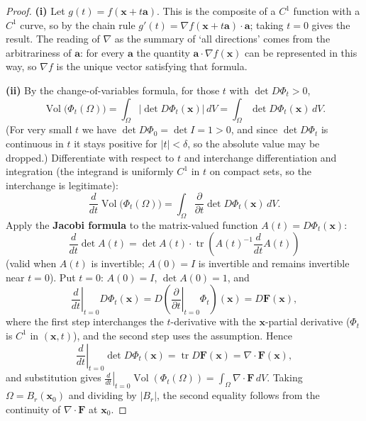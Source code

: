 \begin{proof}
\textbf{(i)} Let $g(t) = f(\mathbf x+t\mathbf a)$. This is the composite of a $C^1$ function with a $C^1$ curve, so by the chain rule $g'(t) = \nabla f(\mathbf x+t\mathbf a)\cdot\mathbf a$; taking $t=0$ gives the result. The reading of $\nabla$ as the summary of `all directions' comes from the arbitrariness of $\mathbf a$: for every $\mathbf a$ the quantity $\mathbf a\cdot\nabla f(\mathbf x)$ can be represented in this way, so $\nabla f$ is the unique vector satisfying that formula.

\textbf{(ii)} By the change-of-variables formula, for those $t$ with $\det D\Phi_t>0$,
\[
\operatorname{Vol}\bigl(\Phi_t(\Omega)\bigr) = \int_{\Omega}\bigl|\det D\Phi_t(\mathbf x)\bigr|\,dV = \int_{\Omega}\det D\Phi_t(\mathbf x)\,dV .
\]
(For very small $t$ we have $\det D\Phi_0 = \det I = 1>0$, and since $\det D\Phi_t$ is continuous in $t$ it stays positive for $|t|<\delta$, so the absolute value may be dropped.) Differentiate with respect to $t$ and interchange differentiation and integration (the integrand is uniformly $C^1$ in $t$ on compact sets, so the interchange is legitimate):
\[
\frac{d}{dt}\operatorname{Vol}\bigl(\Phi_t(\Omega)\bigr) = \int_{\Omega}\frac{\partial}{\partial t}\det D\Phi_t(\mathbf x)\,dV .
\]
Apply the \textbf{Jacobi formula} to the matrix-valued function $A(t) = D\Phi_t(\mathbf x)$:
\[
\frac{d}{dt}\det A(t) = \det A(t)\cdot\operatorname{tr}\!\left(A(t)^{-1}\frac{d}{dt}A(t)\right)
\]
(valid when $A(t)$ is invertible; $A(0)=I$ is invertible and remains invertible near $t=0$). Put $t=0$: $A(0)=I$, $\det A(0)=1$, and
\[
\left.\frac{d}{dt}\right|_{t=0}D\Phi_t(\mathbf x) = D\!\left(\left.\frac{\partial}{\partial t}\right|_{t=0}\Phi_t\right)(\mathbf x) = D\mathbf F(\mathbf x),
\]
where the first step interchanges the $t$-derivative with the $\mathbf x$-partial derivative ($\Phi_t$ is $C^1$ in $(\mathbf x,t)$), and the second step uses the assumption. Hence
\[
\left.\frac{d}{dt}\right|_{t=0}\det D\Phi_t(\mathbf x) = \operatorname{tr}D\mathbf F(\mathbf x) = \nabla\cdot\mathbf F(\mathbf x),
\]
and substitution gives $\left.\frac{d}{dt}\right|_{t=0}\operatorname{Vol}(\Phi_t(\Omega)) = \int_\Omega\nabla\cdot\mathbf F\,dV$. Taking $\Omega = B_r(\mathbf x_0)$ and dividing by $|B_r|$, the second equality follows from the continuity of $\nabla\cdot\mathbf F$ at $\mathbf x_0$.


\end{proof}
